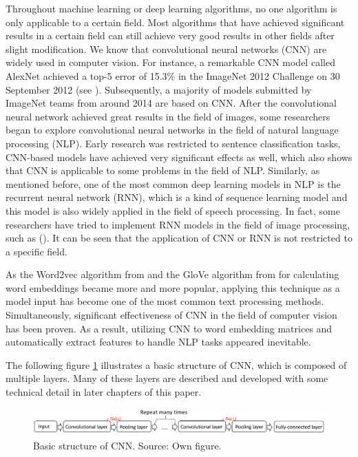 \documentclass[]{krantz}
\begin{document}
Throughout machine learning or deep learning algorithms, no one algorithm is only applicable to a certain field. Most algorithms that have achieved significant results in a certain field can still achieve very good results in other fields after slight modification. We know that convolutional neural networks (CNN) are widely used in computer vision. For instance, a remarkable CNN model called AlexNet achieved a top-5 error of 15.3\% in the ImageNet 2012 Challenge on 30 September 2012 (see \citet{Krizhevsky2012ImageNetCW}). Subsequently, a majority of models submitted by ImageNet teams from around 2014 are based on CNN. After the convolutional neural network achieved great results in the field of images, some researchers began to explore convolutional neural networks in the field of natural language processing (NLP). Early research was restricted to sentence classification tasks, CNN-based models have achieved very significant effects as well, which also shows that CNN is applicable to some problems in the field of NLP. Similarly, as mentioned before, one of the most common deep learning models in NLP is the recurrent neural network (RNN), which is a kind of sequence learning model and this model is also widely applied in the field of speech processing. In fact, some researchers have tried to implement RNN models in the field of image processing, such as (\citet{Visin2015ReNetAR}). It can be seen that the application of CNN or RNN is not restricted to a specific field.

As the Word2vec algorithm from \citet{Mikolov.2013c} and the GloVe algorithm from \citet{Pennington.2014} for calculating word embeddings became more and more popular, applying this technique as a model input has become one of the most common text processing methods. Simultaneously, significant effectiveness of CNN in the field of computer vision has been proven. As a result, utilizing CNN to word embedding matrices and automatically extract features to handle NLP tasks appeared inevitable.

The following figure \ref{fig:figintro1} illustrates a basic structure of CNN, which is composed of multiple layers. Many of these layers are described and developed with some technical detail in later chapters of this paper.

\begin{figure}[h]
\includegraphics[width=1.05\linewidth]{figures/01-00-deep-learning-for-nlp/01_03_basic_structure} \caption{Basic structure of CNN. Source: Own figure.}\label{fig:figintro1}
\end{figure}
\end{document}
